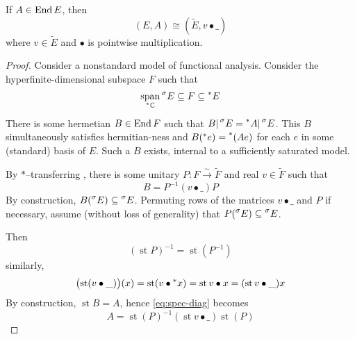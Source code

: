 \documentclass{scrartcl}
\newcommand{\hyper}[1]{\prescript{*}{}{#1}}
\newcommand{\standard}[1]{\prescript{\sigma}{}{#1}}
\DeclareMathOperator{\st}{st}
\begin{document}
\begin{theorem}
  If $A\in\operatorname{End} E$, then
  \[
    (E,A)\cong (\tilde E,v\bullet \_)
  \]
  where $v\in \tilde E$ 
  and $\bullet$ is pointwise multiplication. 
\end{theorem}
\begin{proof}
  Consider a nonstandard model of functional analysis. 
  Consider the hyperfinite-dimensional subspace $F$ such that
  \[
    \Span_{\hyper \C}\standard E \subseteq F \subseteq \hyper E
  \]
  There is some hermetian $B\in\operatorname{End} F$ such that $B|\standard E = \hyper A|\standard E$. This $B$ simultaneously satisfies hermitian-ness and $B(\hyper e)=\hyper(Ae)$ for each $e$ in some (standard) basis of $E$. Such a $B$ exists, internal to a sufficiently saturated model.

  By $*$--transferring , there is some unitary $P:F\xrightarrow{\sim} \tilde F$ and real $v\in \tilde F$ such that
  \begin{equation}
    B = P^{-1}(v\bullet\_)P
    \label{eq:spec-diag}
  \end{equation}
  By construction, $B(\standard E) \subseteq \standard E$. Permuting rows of the matrices $v\bullet\_$ and $P$ if necessary, assume (without loss of generality) that $P(\standard E)\subseteq \standard E$. 
  
  Then
  \[
    (\st P)^{-1}=\st(P^{-1})
  \]
  similarly,
  \[
    \bigl(\st(v\bullet\_)\bigr)(x)=\st(v\bullet\hyper x) = \st v\bullet x = (\st v\bullet\_)x
  \]
  By construction, $\st B=A$, hence \cref{eq:spec-diag} becomes
  \[
    A=\st(P)^{-1} (\st v\bullet\_) \st(P)
  \]
\end{proof}
\end{document}
